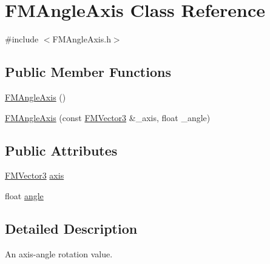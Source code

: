 \hypertarget{classFMAngleAxis}{
\section{FMAngleAxis Class Reference}
\label{classFMAngleAxis}
}


{\ttfamily \#include $<$FMAngleAxis.h$>$}

\subsection*{Public Member Functions}
\begin{DoxyCompactItemize}
\item 
\hyperlink{classFMAngleAxis_a96d6087b312e7a87289e68acf5963fa6}{FMAngleAxis} ()
\item 
\hyperlink{classFMAngleAxis_ac955428debabefe0815a59a7c0bdab8f}{FMAngleAxis} (const \hyperlink{classFMVector3}{FMVector3} \&\_\-axis, float \_\-angle)
\end{DoxyCompactItemize}
\subsection*{Public Attributes}
\begin{DoxyCompactItemize}
\item 
\hyperlink{classFMVector3}{FMVector3} \hyperlink{classFMAngleAxis_a266bfd1ab3786362ebdf9519788e26df}{axis}
\item 
float \hyperlink{classFMAngleAxis_a015f65e6030e6c4969a218631d4d63d0}{angle}
\end{DoxyCompactItemize}


\subsection{Detailed Description}
An axis-\/angle rotation value. 

